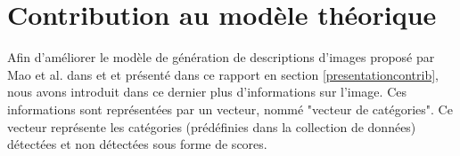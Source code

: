 \pagestyle{fancy}

\renewcommand{\footrulewidth}{1pt}

\fancyhead[L]{\footnotesize \rightmark}
\fancyhead[C]{\thepage}

\fancyfoot[C]{\thepage}


\chapter{Contribution au modèle théorique } \label{contribution}
\qquad Afin d'améliorer le modèle de génération de descriptions d'images proposé par Mao et al. dans \cite{mao2014deep} et \cite{mao2015learning} et présenté dans ce rapport en section \ref{presentationcontrib}, nous avons introduit dans ce dernier plus d'informations sur l'image. Ces informations sont représentées par un vecteur, nommé "vecteur de catégories". Ce vecteur représente les catégories (prédéfinies dans la collection de données) détectées et non détectées sous forme de scores. \\
\smallskip


